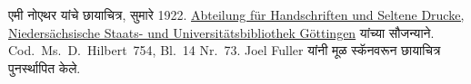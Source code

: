 एमी नोएथर यांचे छायाचित्र, सुमारे 1922.
\href{https://www.sub.uni-goettingen.de/en/collections/erkunden/handschriften}{Abteilung
für Handschriften und Seltene Drucke, Niedersächsische Staats- und
Universitätsbibliothek Göttingen} यांच्या सौजन्याने. Cod.\ Ms.\
D.~Hilbert~754, Bl.~14 Nr.~73. Joel Fuller यांनी मूळ स्कॅनवरून
छायाचित्र पुनर्स्थापित केले.
